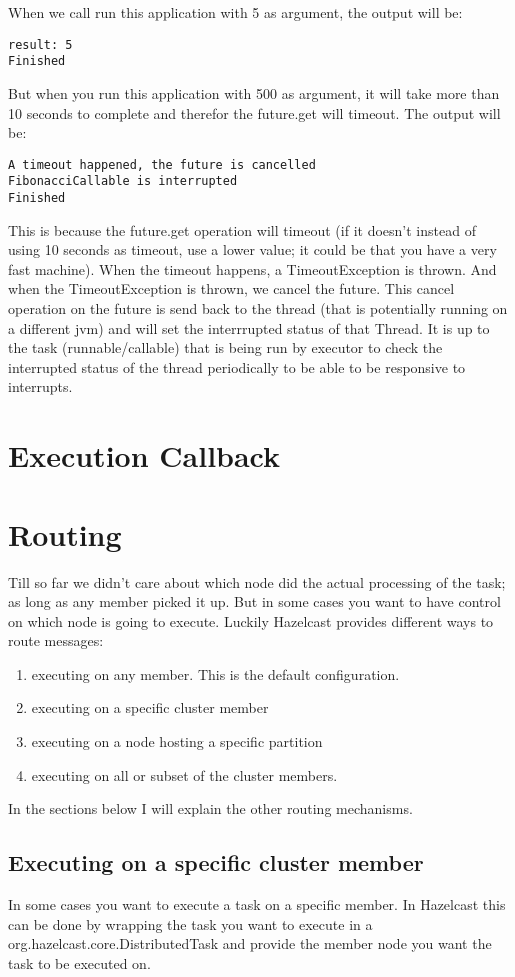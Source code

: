 When we call run this application with 5 as argument, the output will be: 
\begin{verbatim}
result: 5
Finished
\end{verbatim}

But when you run this application with 500 as argument, it will take more than 10 seconds to complete and therefor the future.get will timeout. The output will be:
\begin{verbatim}
A timeout happened, the future is cancelled
FibonacciCallable is interrupted
Finished
\end{verbatim}
This is because the future.get operation will timeout (if it doesn't instead of using 10 seconds as timeout, use a lower value; it could be that you have a very fast machine). When the timeout happens, a TimeoutException is thrown. And when the TimeoutException is thrown, we cancel the future. This cancel operation on the future is send back to the thread (that is potentially running on a different jvm) and will set the interrrupted status of that Thread. It is up to the task (runnable/callable) that is being run by executor to check the interrupted status of the thread periodically to be able to be responsive to interrupts.

\section{Execution Callback}

\section{Routing}

Till so far we didn't care about which node did the actual processing of the task; as long as any member picked it up. But in some cases you want to have control on which node is going to execute. Luckily Hazelcast provides different ways to route messages:
\begin{enumerate}
\item executing on any member. This is the default configuration.
\item executing on a specific cluster member
\item executing on a node hosting a specific partition
\item executing on all or subset of the cluster members.
\end{enumerate}
In the sections below I will explain the other routing mechanisms.

\subsection{Executing on a specific cluster member}
In some cases you want to execute a task on a specific member. In Hazelcast this can be done by wrapping the task you want to execute in a org.hazelcast.core.DistributedTask and provide the member node you want the task to be executed on.

